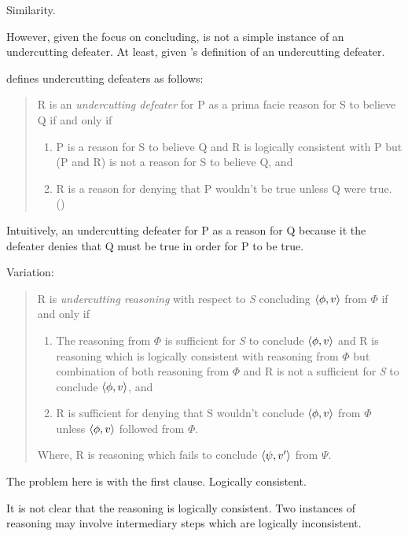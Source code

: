 \begin{note}
  Similarity.

  However, given the focus on concluding, \requ{} is not a simple instance of an undercutting defeater.
  At least, given \citeauthor{Pollock:1987un}'s definition of an undercutting defeater.

  \citeauthor{Pollock:1987un} defines undercutting defeaters as follows:
  \begin{quote}
    R is an \emph{undercutting defeater} for P as a prima facie reason for S to believe Q if and only if
    \begin{enumerate}[label=(UD\arabic*), ref=(UD\arabic*)]
    \item
      P is a reason for S to believe Q and R is logically consistent with P but (P and R) is not a reason for S to believe Q, and
    \item
      R is a reason for denying that P wouldn't be true unless Q were true.%
      \mbox{}\hfill\mbox{(\citeyear[485]{Pollock:1987un})}
    \end{enumerate}
  \end{quote}
  Intuitively, an undercutting defeater for P as a reason for Q because it the defeater denies that Q must be true in order for P to be true.

  Variation:
  \begin{quote}
    R is \emph{undercutting reasoning} with respect to \emph{S} concluding \(\langle \phi, v \rangle\) from \(\Phi\) if and only if
    \begin{enumerate}[label=(UR\arabic*), ref=(UR\arabic*)]
    \item
      The reasoning from \(\Phi\) is sufficient for \emph{S} to conclude \(\langle \phi, v \rangle\) and R is reasoning which is logically consistent with reasoning from \(\Phi\) but combination of both reasoning from \(\Phi\) and R is not a sufficient for \emph{S} to conclude \(\langle \phi, v \rangle\), and
    \item
      R is sufficient for denying that S wouldn't conclude \(\langle \phi, v \rangle\) from \(\Phi\) unless \(\langle \phi, v \rangle\) followed from \(\Phi\).%
    \end{enumerate}
    Where, R is reasoning which fails to conclude \(\langle \psi, v' \rangle\) from \(\Psi\).
  \end{quote}

  The problem here is with the first clause.
  Logically consistent.

  It is not clear that the reasoning is logically consistent.
  Two instances of reasoning may involve intermediary steps which are logically inconsistent.


\end{note}
